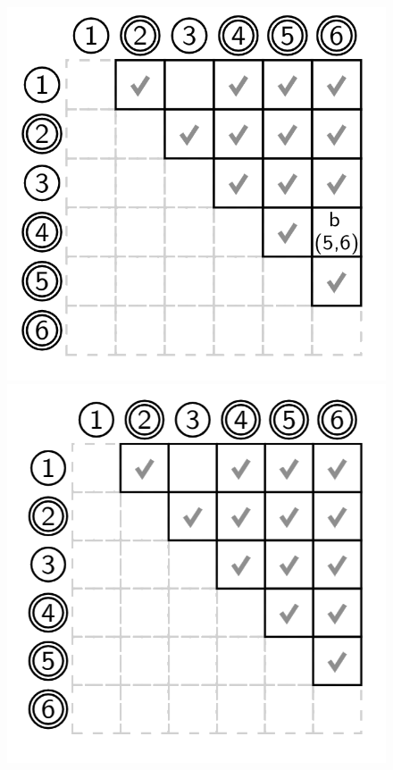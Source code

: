 \begin{enumerate}
\begin{figure}[H]
            \includegraphics[scale=0.175]{img/cap2/amin8.png}
            \includegraphics[scale=0.175]{img/cap2/amin9.png}
        \end{figure}
\end{enumerate}

